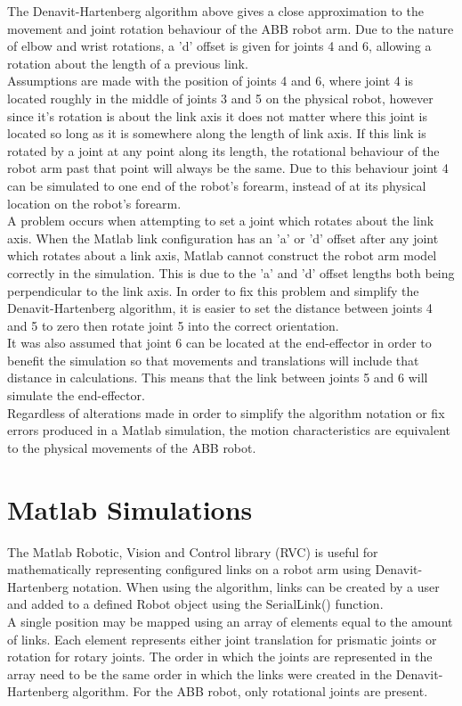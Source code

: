 \documentclass[11pt,a4paper]{report}
\begin{document}
The Denavit-Hartenberg algorithm above gives a close approximation to the movement and joint rotation behaviour of the ABB robot arm. Due to the nature of elbow and wrist rotations, a 'd' offset is given for joints 4 and 6, allowing a rotation about the length of a previous link.\\
Assumptions are made with the position of joints 4 and 6, where joint 4 is located roughly in the middle of joints 3 and 5 on the physical robot, however since it's rotation is about the link axis it does not matter where this joint is located so long as it is somewhere along the length of link axis. If this link is rotated by a joint at any point along its length, the rotational behaviour of the robot arm past that point will always be the same. Due to this behaviour joint 4 can be simulated to one end of the robot's forearm, instead of at its physical location on the robot's forearm.\\
A problem occurs when attempting to set a joint which rotates about the link axis. When the Matlab link configuration has an 'a' or 'd' offset after any joint which rotates about a link axis, Matlab cannot construct the robot arm model correctly in the simulation. This is due to the 'a' and 'd' offset lengths both being perpendicular to the link axis. In order to fix this problem and simplify the Denavit-Hartenberg algorithm, it is easier to set the distance between joints 4 and 5 to zero then rotate joint 5 into the correct orientation.\\
It was also assumed that joint 6 can be located at the end-effector in order to benefit the simulation so that movements and translations will include that distance in calculations. This means that the link between joints 5 and 6 will simulate the end-effector.\\
Regardless of alterations made in order to simplify the algorithm notation or fix errors produced in a Matlab simulation, the motion characteristics are equivalent to the physical movements of the ABB robot.

\section{Matlab Simulations}
The Matlab Robotic, Vision and Control library (RVC) is useful for mathematically representing configured links on a robot arm using Denavit-Hartenberg notation. When using the algorithm, links can be created by a user and added to a defined Robot object using the SerialLink() function.\\
A single position may be mapped using an array of elements equal to the amount of links. Each element represents either joint translation for prismatic joints or rotation for rotary joints. The order in which the joints are represented in the array need to be the same order in which the links were created in the Denavit-Hartenberg algorithm. For the ABB robot, only rotational joints are present. 
\end{document}
